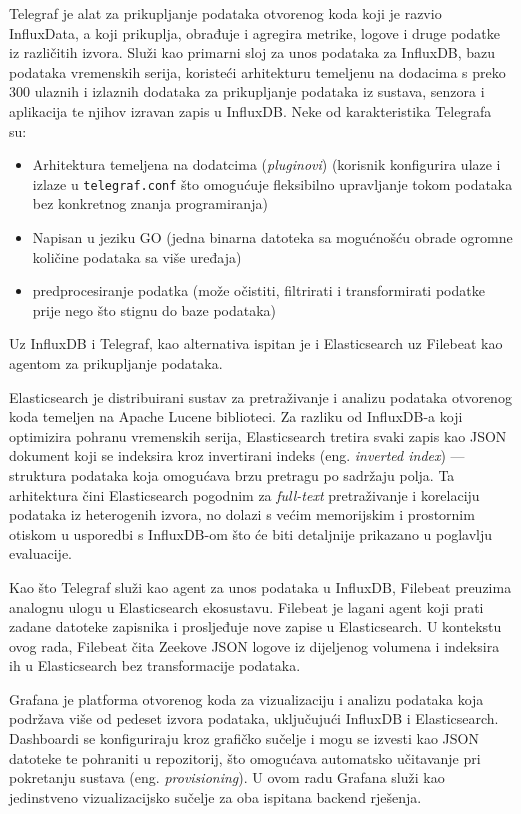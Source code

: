Telegraf je alat za prikupljanje podataka otvorenog koda koji je razvio InfluxData, a koji prikuplja, obrađuje i agregira metrike, logove i druge podatke iz različitih izvora. 
Služi kao primarni sloj za unos podataka za InfluxDB, bazu podataka vremenskih serija, koristeći arhitekturu temeljenu na dodacima s preko 300 ulaznih i izlaznih dodataka za prikupljanje 
podataka iz sustava, senzora i aplikacija te njihov izravan zapis u InfluxDB.\cite{telegraf_docs}\cite{influxdb_telegraf_intro}
Neke od karakteristika Telegrafa su:
\begin{itemize}
    \item Arhitektura temeljena na dodatcima (\textit{pluginovi}) (korisnik konfigurira ulaze i izlaze u \lstinline|telegraf.conf| što omogućuje fleksibilno upravljanje tokom podataka bez konkretnog znanja programiranja)
    \item Napisan u jeziku GO (jedna binarna datoteka sa mogućnošću obrade ogromne količine podataka sa više uređaja)
    \item predprocesiranje podatka (može očistiti, filtrirati i transformirati podatke prije nego što stignu do baze podataka)
\end{itemize}

Uz InfluxDB i Telegraf, kao alternativa ispitan je i Elasticsearch uz Filebeat kao agentom za prikupljanje podataka.

Elasticsearch je distribuirani sustav za pretraživanje i analizu podataka otvorenog koda temeljen na Apache Lucene biblioteci.\cite{elasticsearch_docs} Za razliku od 
InfluxDB-a koji optimizira pohranu vremenskih serija, Elasticsearch tretira svaki zapis kao JSON dokument koji se indeksira kroz invertirani indeks (eng. 
\textit{inverted index}) — struktura podataka koja omogućava brzu pretragu po sadržaju polja. Ta arhitektura čini Elasticsearch pogodnim za \textit{full-text} 
pretraživanje i korelaciju podataka iz heterogenih izvora, no dolazi s većim memorijskim i prostornim otiskom u usporedbi s InfluxDB-om što će biti detaljnije 
prikazano u poglavlju evaluacije.

Kao što Telegraf služi kao agent za unos podataka u InfluxDB, Filebeat preuzima analognu ulogu u Elasticsearch ekosustavu.\cite{filebeat_docs} Filebeat je lagani 
agent koji prati zadane datoteke zapisnika i prosljeđuje nove zapise u Elasticsearch. U kontekstu ovog rada, Filebeat čita Zeekove JSON logove iz dijeljenog volumena i 
indeksira ih u Elasticsearch bez transformacije podataka.

Grafana je platforma otvorenog koda za vizualizaciju i analizu podataka koja podržava više od pedeset izvora podataka, uključujući InfluxDB i 
Elasticsearch.\cite{grafana_docs} Dashboardi se konfiguriraju kroz grafičko sučelje i mogu se izvesti kao JSON datoteke te pohraniti u repozitorij, što 
omogućava automatsko učitavanje pri pokretanju sustava (eng. \textit{provisioning}). U ovom radu Grafana služi kao jedinstveno vizualizacijsko sučelje za oba ispitana 
backend rješenja.